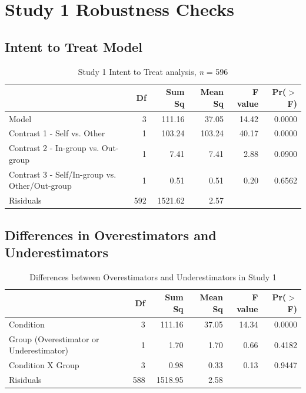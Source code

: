 \documentclass[12pt,]{article}
\begin{document}
\clearpage
\section{Study 1 Robustness Checks}
\label{appendix:study1_robust}


\subsection{Intent to Treat Model}
\label{appendix:itt1}


\begin{table}[ht]
\centering
\begin{tabular}{lrrrrr}
  \hline
 & Df & Sum Sq & Mean Sq & F value & Pr($>$F) \\ 
  \hline
Model & 3 & 111.16 & 37.05 & 14.42 & 0.0000 \\ 
  Contrast 1 - Self vs. Other & 1 & 103.24 & 103.24 & 40.17 & 0.0000 \\ 
  Contrast 2 - In-group vs. Out-group & 1 & 7.41 & 7.41 & 2.88 & 0.0900 \\ 
  Contrast 3 - Self/In-group vs. Other/Out-group & 1 & 0.51 & 0.51 & 0.20 & 0.6562 \\ 
  Risiduals & 592 & 1521.62 & 2.57 &  &  \\ 
   \hline
\end{tabular}
\caption{Study 1 Intent to Treat analysis, \emph{n} = 596} 
\label{ITT_s1}
\end{table}


\clearpage
\subsection{Differences in Overestimators and Underestimators}
\label{appendix:over_under1}

\begin{table}[ht]
\centering
\begin{tabular}{lrrrrr}
  \hline
 & Df & Sum Sq & Mean Sq & F value & Pr($>$F) \\ 
  \hline
Condition & 3 & 111.16 & 37.05 & 14.34 & 0.0000 \\ 
  Group (Overestimator or Underestimator) & 1 & 1.70 & 1.70 & 0.66 & 0.4182 \\ 
  Condition X Group & 3 & 0.98 & 0.33 & 0.13 & 0.9447 \\ 
  Risiduals & 588 & 1518.95 & 2.58 &  &  \\ 
   \hline
\end{tabular}
\caption{Differences between Overestimators and Underestimators in Study 1} 
\label{over_underS1}
\end{table}
\end{document}
